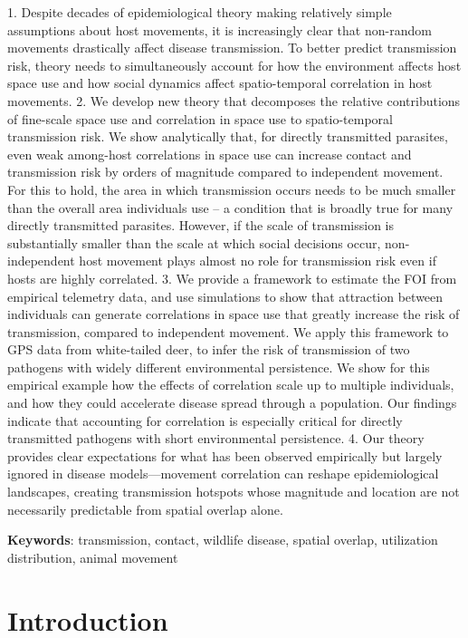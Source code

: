 \documentclass[letterpaper]{article}
\begin{document}
1. Despite decades of epidemiological theory making relatively simple assumptions about host movements, it is increasingly clear that non-random movements drastically affect disease transmission. To better predict transmission risk, theory needs to simultaneously account for how the environment affects host space use and how social dynamics affect spatio-temporal correlation in host movements. 
2. We develop new theory that decomposes the relative contributions of fine-scale space use and correlation in space use to spatio-temporal transmission risk. We show analytically that, for directly transmitted parasites, even weak among-host correlations in space use can increase contact and transmission risk by orders of magnitude compared to independent movement. For this to hold, the area in which transmission occurs needs to be much smaller than the overall area individuals use -- a condition that is broadly true for many directly transmitted parasites. However, if the scale of transmission is substantially smaller than the scale at which social decisions occur, non-independent host movement plays almost no role for transmission risk even if hosts are highly correlated.
3. We provide a framework to estimate the FOI from empirical telemetry data, and use simulations to show that attraction between individuals can generate correlations in space use that greatly increase the risk of transmission, compared to independent movement. We apply this framework to GPS data from white-tailed deer, to infer the risk of transmission of two pathogens with widely different environmental persistence. We show for this empirical example how the effects of correlation scale up to multiple individuals, and how they could accelerate disease spread through a population. Our findings indicate that accounting for correlation is especially critical for directly transmitted pathogens with short environmental persistence. 
4. Our theory provides clear expectations for what has been observed empirically but largely ignored in disease models---movement correlation can reshape epidemiological landscapes, creating transmission hotspots whose magnitude and location are not necessarily predictable from spatial overlap alone.

\bigskip
\noindent
\textbf{Keywords}: transmission, contact, wildlife disease, spatial overlap, utilization distribution, animal movement

\section*{Introduction}
\end{document}
